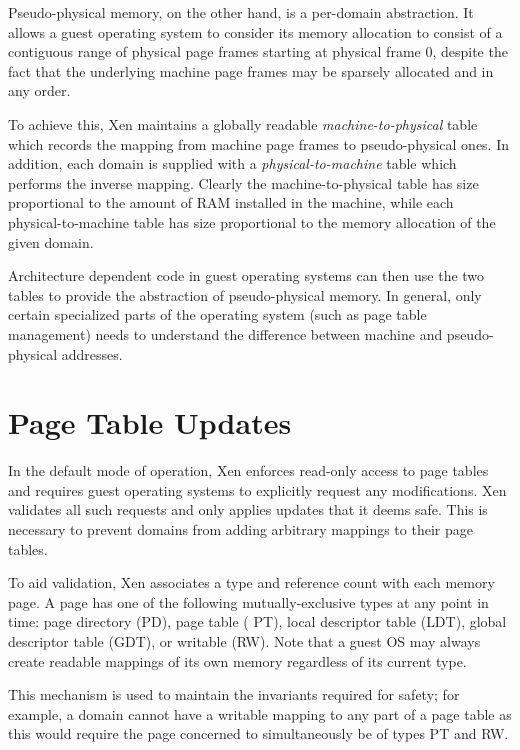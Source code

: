 Pseudo-physical memory, on the other hand, is a per-domain
abstraction. It allows a guest operating system to consider its memory
allocation to consist of a contiguous range of physical page frames
starting at physical frame 0, despite the fact that the underlying
machine page frames may be sparsely allocated and in any order.

To achieve this, Xen maintains a globally readable {\it
  machine-to-physical} table which records the mapping from machine
page frames to pseudo-physical ones. In addition, each domain is
supplied with a {\it physical-to-machine} table which performs the
inverse mapping. Clearly the machine-to-physical table has size
proportional to the amount of RAM installed in the machine, while each
physical-to-machine table has size proportional to the memory
allocation of the given domain.

Architecture dependent code in guest operating systems can then use
the two tables to provide the abstraction of pseudo-physical memory.
In general, only certain specialized parts of the operating system
(such as page table management) needs to understand the difference
between machine and pseudo-physical addresses.


\section{Page Table Updates}

In the default mode of operation, Xen enforces read-only access to
page tables and requires guest operating systems to explicitly request
any modifications.  Xen validates all such requests and only applies
updates that it deems safe.  This is necessary to prevent domains from
adding arbitrary mappings to their page tables.

To aid validation, Xen associates a type and reference count with each
memory page. A page has one of the following mutually-exclusive types
at any point in time: page directory ({\sf PD}), page table ({\sf
  PT}), local descriptor table ({\sf LDT}), global descriptor table
({\sf GDT}), or writable ({\sf RW}). Note that a guest OS may always
create readable mappings of its own memory regardless of its current
type.

This mechanism is used to maintain the invariants required for safety;
for example, a domain cannot have a writable mapping to any part of a
page table as this would require the page concerned to simultaneously
be of types {\sf PT} and {\sf RW}.


